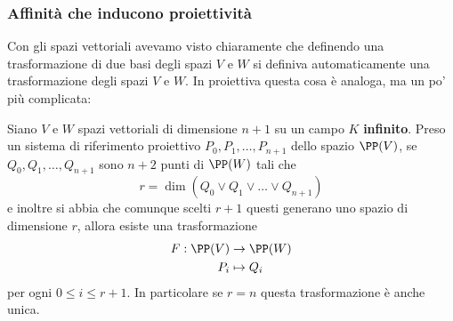 \documentclass[11pt]{scrartcl}
\begin{document}
   	 \subsubsection{Affinità che inducono proiettività}
   	 Con gli spazi vettoriali avevamo visto chiaramente che definendo una trasformazione di due basi degli spazi $V$ e $W$ si definiva automaticamente una trasformazione degli spazi $V$ e $W$. In proiettiva questa cosa è analoga, ma un po' più complicata:
   	 \begin{theorem}
   	 	Siano $V$ e $W$ spazi vettoriali di dimensione $n+1$ su un campo $K$ \textbf{infinito}. Preso un sistema di riferimento proiettivo $P_0,P_1,\dots,P_{n+1}$ dello spazio $\PP(V)$, se $Q_0,Q_1,\dots,Q_{n+1}$ sono $n+2$ punti di $\PP(W)$ tali che
		$$r=\dim\left(Q_0\lor Q_1\lor \dots \lor Q_{n+1}\right)$$
   	 	e inoltre si abbia che comunque scelti $r+1$ questi generano uno spazio di dimensione $r$, allora esiste una trasformazione 
   	 	\begin{align*}
   	 		F:\PP(V)&\to\PP(W) \\
   	 		P_i & \mapsto Q_i
   	 	\end{align*}
   	 	per ogni $0\le i\le r+1$. In particolare se $r=n$ questa trasformazione è anche unica.
   	 \end{theorem}
\end{document}
